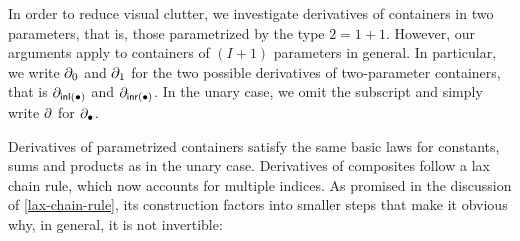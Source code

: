 In order to reduce visual clutter, we investigate derivatives of containers in two parameters,
that is, those parametrized by the type \( 2 = 1 + 1 \).
However, our arguments apply to containers of \( (I + 1) \) parameters in general.
In particular, we write \( \partial_0 \) and \( \partial_1 \) for the two possible derivatives of two-parameter containers,
that is \( \partial_{\operatorname{\mathsf{inl}}(\bullet)} \) and \( \partial_{\operatorname{\mathsf{inr}}(\bullet)} \).
In the unary case, we omit the subscript and simply write \( \partial \) for \( \partial_{\bullet} \).

Derivatives of parametrized containers satisfy the same basic laws for constants, sums and products as in the unary case.
Derivatives of composites follow a lax chain rule, which now accounts for multiple indices.
As promised in the discussion of \autoref{lax-chain-rule},
its construction factors into smaller steps that make it obvious why, in general, it is not invertible:

